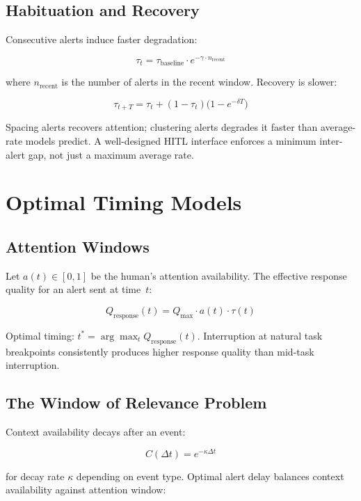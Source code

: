 \subsection{Habituation and Recovery}

Consecutive alerts induce faster degradation:

\[
\tau_t = \tau_{\text{baseline}} \cdot e^{-\gamma \cdot n_\text{recent}}
\]

where $n_\text{recent}$ is the number of alerts in the recent window. Recovery is slower:

\[
\tau_{t+T} = \tau_t + (1 - \tau_t)\bigl(1 - e^{-\delta T}\bigr)
\]

\begin{cautionbox}
Spacing alerts recovers attention; clustering alerts degrades it faster than average-rate models predict. A well-designed HITL interface enforces a minimum inter-alert gap, not just a maximum average rate.
\end{cautionbox}

\section{Optimal Timing Models}

\subsection{Attention Windows}

Let $a(t) \in [0,1]$ be the human's attention availability. The effective response quality for an alert sent at time~$t$:

\[
Q_\text{response}(t) = Q_\text{max} \cdot a(t) \cdot \tau(t)
\]

Optimal timing: $t^* = \arg\max_t Q_\text{response}(t)$. Interruption at natural task breakpoints consistently produces higher response quality than mid-task interruption.

\subsection{The Window of Relevance Problem}

Context availability decays after an event:

\[
C(\Delta t) = e^{-\kappa \Delta t}
\]

for decay rate $\kappa$ depending on event type. Optimal alert delay balances context availability against attention window:


